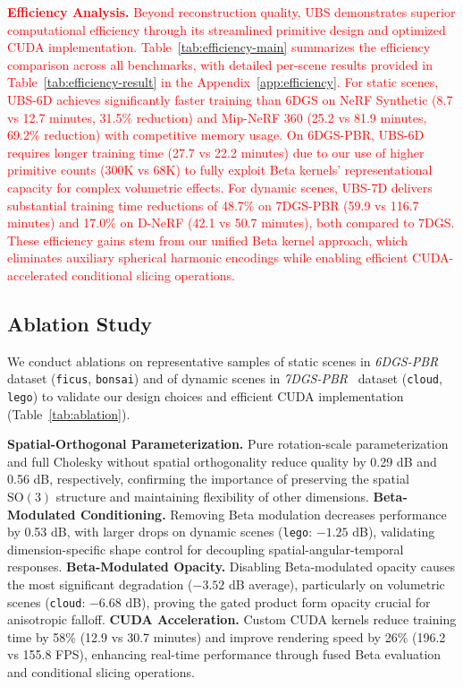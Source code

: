 \documentclass{article} %
\begin{document}
\textcolor{red}{
\textbf{Efficiency Analysis.} Beyond reconstruction quality, UBS demonstrates superior computational efficiency through its streamlined primitive design and optimized CUDA implementation. Table~\ref{tab:efficiency-main} summarizes the efficiency comparison across all benchmarks, with detailed per-scene results provided in Table~\ref{tab:efficiency-result} in the Appendix~\ref{app:efficiency}. For static scenes, UBS-6D achieves significantly faster training than 6DGS on NeRF Synthetic (8.7 vs 12.7 minutes, 31.5\% reduction) and Mip-NeRF 360 (25.2 vs 81.9 minutes, 69.2\% reduction) with competitive memory usage. On 6DGS-PBR, UBS-6D requires longer training time (27.7 vs 22.2 minutes) due to our use of higher primitive counts (300K vs 68K) to fully exploit Beta kernels' representational capacity for complex volumetric effects. For dynamic scenes, UBS-7D delivers substantial training time reductions of 48.7\% on 7DGS-PBR (59.9 vs 116.7 minutes) and 17.0\% on D-NeRF (42.1 vs 50.7 minutes), both compared to 7DGS. These efficiency gains stem from our unified Beta kernel approach, which eliminates auxiliary spherical harmonic encodings while enabling efficient CUDA-accelerated conditional slicing operations.
}


\subsection{Ablation Study}
We conduct ablations on representative samples of static scenes in \textit{6DGS-PBR}~\citep{gao20246dgs} dataset (\texttt{ficus}, \texttt{bonsai}) and of dynamic scenes in \textit{7DGS-PBR}~\citep{gao20257dgs} dataset (\texttt{cloud}, \texttt{lego}) to validate our design choices and efficient CUDA implementation (Table~\ref{tab:ablation}).

\textbf{Spatial-Orthogonal Parameterization.} Pure rotation-scale parameterization and full Cholesky without spatial orthogonality reduce quality by 0.29 dB and 0.56 dB, respectively, confirming the importance of preserving the spatial $\text{SO}(3)$ structure and maintaining flexibility of other dimensions. \textbf{Beta-Modulated Conditioning.} Removing Beta modulation decreases performance by 0.53 dB, with larger drops on dynamic scenes (\texttt{lego}: $-1.25$ dB), validating dimension-specific shape control for decoupling spatial-angular-temporal responses.  \textbf{Beta-Modulated Opacity.} Disabling Beta-modulated opacity causes the most significant degradation ($-3.52$ dB average), particularly on volumetric scenes (\texttt{cloud}: $-6.68$ dB), proving the gated product form opacity crucial for anisotropic falloff. \textbf{CUDA Acceleration.} Custom CUDA kernels reduce training time by 58\% (12.9 vs 30.7 minutes) and improve rendering speed by 26\% (196.2 vs 155.8 FPS), enhancing real-time performance through fused Beta evaluation and conditional slicing operations. 
\end{document}
